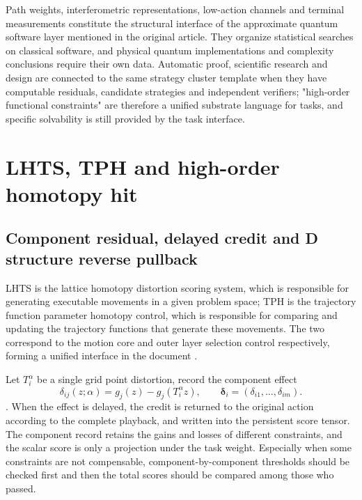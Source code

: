 \documentclass[11pt,a4paper]{article}
\theoremstyle{plain}
\theoremstyle{definition}
\theoremstyle{remark}
\begin{document}
\begin{CJK*}
Path weights, interferometric representations, low-action channels and terminal measurements constitute the structural interface of the approximate quantum software layer mentioned in the original article. They organize statistical searches on classical software, and physical quantum implementations and complexity conclusions require their own data. Automatic proof, scientific research and design are connected to the same strategy cluster template when they have computable residuals, candidate strategies and independent verifiers; "high-order functional constraints" are therefore a unified substrate language for tasks, and specific solvability is still provided by the task interface.

\section { LHTS, TPH and high-order homotopy hit }\label{ss:hitting}


\subsection { Component residual, delayed credit and D structure reverse pullback }

LHTS is the lattice homotopy distortion scoring system, which is responsible for generating executable movements in a given problem space; TPH is the trajectory function parameter homotopy control, which is responsible for comparing and updating the trajectory functions that generate these movements. The two correspond to the motion core and outer layer selection control respectively, forming a unified interface in the document \cite{S34,S35}.

Let $T_i^\alpha$ be a single grid point distortion, record the component effect \[
 \delta_{ij}(z;\alpha)=g_j(z)-g_j(T_i^\alpha z),
 \qquad \boldsymbol\delta_i=(\delta_{i1},\ldots,\delta_{im}).
\]. When the effect is delayed, the credit is returned to the original action according to the complete playback, and written into the persistent score tensor. The component record retains the gains and losses of different constraints, and the scalar score is only a projection under the task weight. Especially when some constraints are not compensable, component-by-component thresholds should be checked first and then the total scores should be compared among those who passed.


\end{CJK*}
\end{document}
